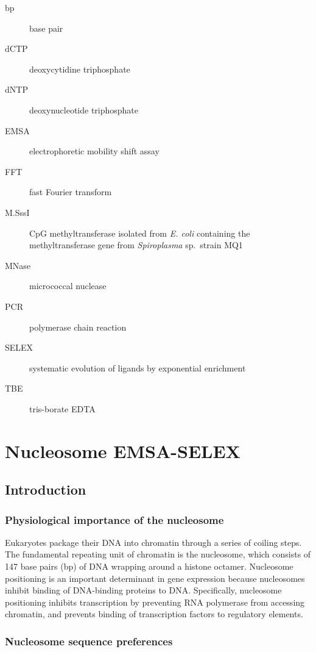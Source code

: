 \documentclass[a4paper, numbers=noenddot]{scrbook}
\begin{document}
\begin{description}
\item [bp] base pair
\item [dCTP] deoxycytidine triphosphate
\item [dNTP] deoxynucleotide triphosphate
\item [EMSA] electrophoretic mobility shift assay
\item [FFT] fast Fourier transform
\item [M.SssI] CpG methyltransferase isolated from \emph{E. coli} containing the methyltransferase gene from \emph{Spiroplasma} sp.\ strain MQ1
\item [MNase] micrococcal nuclease
\item [PCR] polymerase chain reaction
\item [SELEX] systematic evolution of ligands by exponential enrichment
\item [TBE] tris-borate EDTA
\end{description}

\mainmatter

\chapter{Nucleosome EMSA-SELEX}
\label{ch:emsaselex}

\section{Introduction}
\label{sec:emsaselex_intro}

\subsection{Physiological importance of the nucleosome}
\label{ssec:emsaselex_intro_importance}

Eukaryotes package their DNA into chromatin through a series of coiling steps.  The fundamental repeating unit of chromatin is the nucleosome, which consists of 147 base pairs (bp) of DNA wrapping around a histone octamer.  Nucleosome positioning is an important determinant in gene expression because nucleosomes inhibit binding of DNA-binding proteins to DNA.  Specifically, nucleosome positioning inhibits transcription by preventing RNA polymerase from accessing chromatin, and prevents binding of transcription factors to regulatory elements.

\subsection{Nucleosome sequence preferences}
\label{ssec:emsaselex_intro_seqpref}
\end{document}
